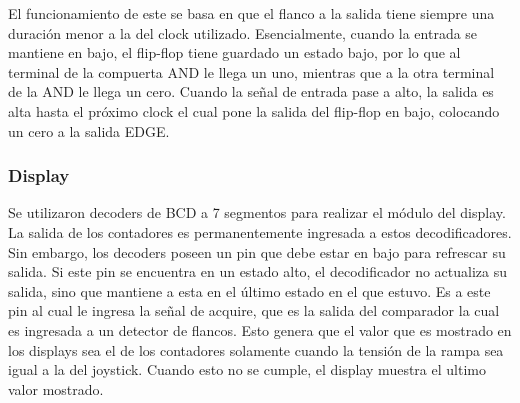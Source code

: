 El funcionamiento de este se basa en que el flanco a la salida tiene siempre una duración menor a la del clock utilizado. Esencialmente, cuando la entrada se mantiene en bajo, el flip-flop tiene guardado un estado bajo, por lo que al terminal de la compuerta AND le llega un uno, mientras que a la otra terminal de la AND le llega un cero. Cuando la señal de entrada pase a alto, la salida es alta hasta el próximo clock el cual pone la salida del flip-flop en bajo, colocando un cero a la salida EDGE.

\subsubsection{Display}

Se utilizaron decoders de BCD a 7 segmentos para realizar el módulo del display. La salida de los contadores es permanentemente ingresada a estos decodificadores. Sin embargo, los decoders poseen un pin que debe estar en bajo para refrescar su salida. Si este pin se encuentra en un estado alto, el decodificador no actualiza su salida, sino que mantiene a esta en el último estado en el que estuvo. Es a este pin al cual le ingresa la señal de acquire, que es la salida del comparador la cual es ingresada a un detector de flancos. Esto genera que el valor que es mostrado en los displays sea el de los contadores solamente cuando la tensión de la rampa sea igual a la del joystick. Cuando esto no se cumple, el display muestra el ultimo valor mostrado.

